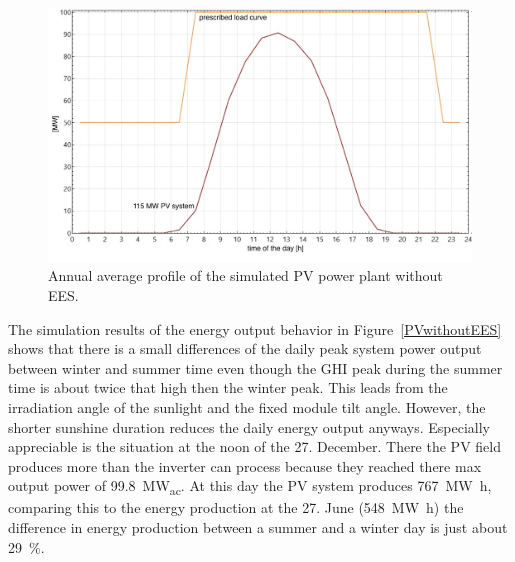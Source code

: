 \begin{figure}[htbp]  
\centering
\includegraphics[width=0.8\linewidth]{FIG/PVwithoutEESanual}
\caption[Annual average profile of the simulated PV power plant without EES.]{Annual average profile of the simulated PV power plant without EES.}\label{PVwithoutEESanual}
\end{figure}
The simulation results of the energy output behavior in Figure~\ref{PVwithoutEES} shows that there is a small differences of the daily peak system power output between winter and summer time even though the GHI peak during the summer time is about twice that high then the winter peak. This leads from the irradiation angle of the sunlight and the fixed module tilt angle. However, the shorter sunshine duration reduces the daily energy output anyways. Especially appreciable is the situation at the noon of the 27. December. There the PV field produces more than the inverter can process because they reached there max output power of \SI{99.8}{\mega\watt}\textsubscript{ac}. At this day the PV system produces \SI{767}{\mega\watt\hour}, comparing this to the energy production at the 27. June (\SI{548}{\mega\watt\hour}) the difference in energy production between a summer and a winter day is just about \SI{29}{\percent}.

